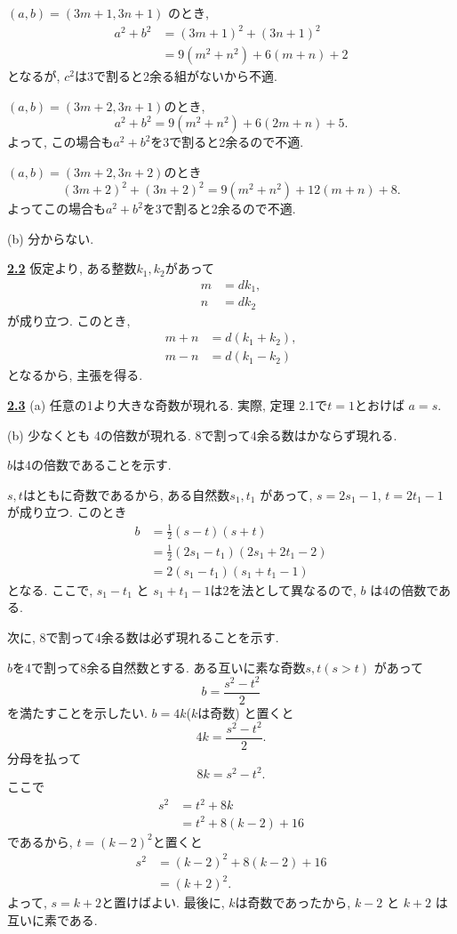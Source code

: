 \documentclass{jarticle}
\newcommand{\cnt}[1]{\noindent \underline{\textbf{#1}}}
\begin{document}
\noindent $(a, b) = (3m+1, 3n+1)$ のとき,
\begin{align*}
a^2 + b^2
  &= (3m+1)^2 + (3n+1)^2 \\
  &= 9(m^2 + n^2) + 6(m+n) + 2
\end{align*}
となるが, $c^2$は3で割ると2余る組がないから不適.

\noindent $(a, b) = (3m+2, 3n+1)$のとき,
\[
  a^2 + b^2 = 9(m^2 + n^2) + 6(2m + n) + 5.
\]
よって, この場合も$a^2 + b^2$を3で割ると2余るので不適.

\noindent $(a, b) = (3m+2, 3n+2)$のとき
\[
  (3m+2)^2 + (3n+2)^2 = 9(m^2 + n^2) + 12(m+n) + 8.
\]
よってこの場合も$a^2 + b^2$を3で割ると2余るので不適.

(b) 分からない.

\cnt{2.2} %
仮定より, ある整数$k_1, k_2$があって
\begin{align*}
  m &= dk_1, \\
  n &= dk_2
\end{align*}
が成り立つ.
このとき,
\begin{align*}
  m + n &= d(k_1 + k_2), \\
  m - n &= d(k_1 - k_2)
\end{align*}
となるから, 主張を得る.

\cnt{2.3} \indent %
(a) 任意の1より大きな奇数が現れる.
実際, 定理 2.1で$t=1$とおけば $a = s$.

(b) 少なくとも 4の倍数が現れる. 8で割って4余る数はかならず現れる.

$b$は4の倍数であることを示す.

$s, t$はともに奇数であるから, ある自然数$s_1, t_1$ があって, $s = 2s_1 - 1$, $t = 2t_1 - 1$
が成り立つ.
このとき
\begin{align*}
b
  &= \frac{1}{2}(s - t)(s + t) \\
  &= \frac{1}{2}(2s_1 - t_1)(2s_1 + 2t_1 - 2) \\
  &= 2(s_1 - t_1)(s_1 + t_1 - 1)
\end{align*}
となる.
ここで, $s_1 - t_1$ と $s_1 + t_1 - 1$は2を法として異なるので, $b$ は4の倍数である.

次に, 8で割って4余る数は必ず現れることを示す.

$b$を4で割って8余る自然数とする. ある互いに素な奇数$s, t (s > t)$ があって
\[
  b = \frac{s^2 - t^2}{2}
\]
を満たすことを示したい.
$b = 4k$($k$は奇数) と置くと
\[
  4k = \frac{s^2 - t^2}{2}.
\]
分母を払って
\[
  8k = s^2 - t^2.
\]
ここで
\begin{align*}
s^2
  &= t^2 + 8k \\
  &= t^2 + 8(k-2) + 16
\end{align*}
であるから, $t = (k-2)^2$と置くと
\begin{align*}
  s^2
    &= (k-2)^2 + 8(k-2) + 16 \\
    &= (k + 2)^2.
\end{align*}
よって, $s = k + 2$と置けばよい.
最後に, $k$は奇数であったから, $k-2$ と $k+2$ は互いに素である.
\end{document}

